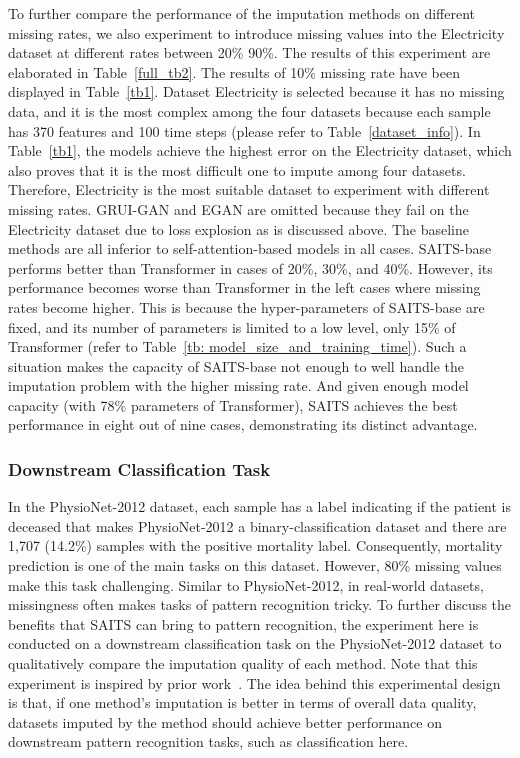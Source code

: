 \documentclass{article}
\begin{document}
To further compare the performance of the imputation methods on different missing rates, we also experiment to introduce missing values into the Electricity dataset at different rates between 20\%  90\%. The results of this experiment are elaborated in Table~\ref{full_tb2}. The results of 10\% missing rate have been displayed in Table~\ref{tb1}. Dataset Electricity is selected because it has no missing data, and it is the most complex among the four datasets because each sample has 370 features and 100 time steps (please refer to Table~\ref{dataset_info}). In Table~\ref{tb1}, the models achieve the highest error on the Electricity dataset, which also proves that it is the most difficult one to impute among four datasets. Therefore, Electricity is the most suitable dataset to experiment with different missing rates. GRUI-GAN and EGAN are omitted because they fail on the Electricity dataset due to loss explosion as is discussed above. The baseline methods are all inferior to self-attention-based models in all cases. SAITS-base performs better than Transformer in cases of 20\%, 30\%, and 40\%. However, its performance becomes worse than Transformer in the left cases where missing rates become higher. This is because the hyper-parameters of SAITS-base are fixed, and its number of parameters is limited to a low level, only 15\% of Transformer (refer to Table~\ref{tb: model_size_and_training_time}). Such a situation makes the capacity of SAITS-base not enough to well handle the imputation problem with the higher missing rate. And given enough model capacity (with 78\% parameters of Transformer), SAITS achieves the best performance in eight out of nine cases, demonstrating its distinct advantage.

\subsubsection{Downstream Classification Task} \label{downstream_task}
In the PhysioNet-2012 dataset, each sample has a label indicating if the patient is deceased that makes PhysioNet-2012 a binary-classification dataset and there are 1,707 (14.2\%) samples with the positive mortality label. Consequently, mortality prediction is one of the main tasks on this dataset. However, 80\% missing values make this task challenging. Similar to PhysioNet-2012, in real-world datasets, missingness often makes tasks of pattern recognition tricky. To further discuss the benefits that SAITS can bring to pattern recognition, the experiment here is conducted on a downstream classification task on the PhysioNet-2012 dataset to qualitatively compare the imputation quality of each method. Note that this experiment is inspired by prior work~\cite{Cao2018BRITS, Luo2018GRUI, Luo2019E2GAN, Fortuin2020GPVAE, Ramchandran2021LVAE}. The idea behind this experimental design is that, if one method's imputation is better in terms of overall data quality, datasets imputed by the method should achieve better performance on downstream pattern recognition tasks, such as classification here.
\end{document}
